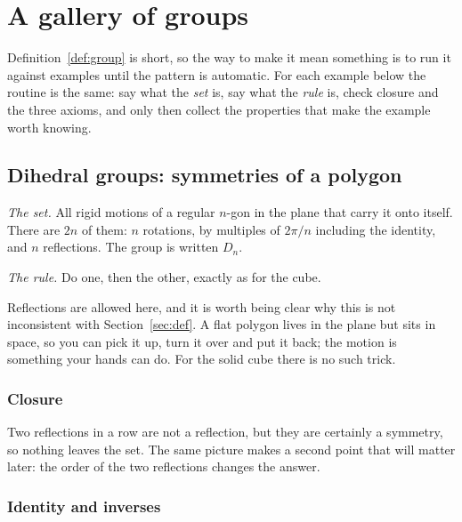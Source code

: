 \section{A gallery of groups}

Definition~\ref{def:group} is short, so the way to make it mean something is to run it against
examples until the pattern is automatic. For each example below the routine is the same: say what
the \emph{set} is, say what the \emph{rule} is, check closure and the three axioms, and only then
collect the properties that make the example worth knowing.

\subsection{Dihedral groups: symmetries of a polygon}\label{sec:dihedral}

\emph{The set.} All rigid motions of a regular $n$-gon in the plane that carry it onto itself. There
are $2n$ of them: $n$ rotations, by multiples of $2\pi/n$ including the identity, and $n$
reflections. The group is written $D_n$.

\emph{The rule.} Do one, then the other, exactly as for the cube.

Reflections are allowed here, and it is worth being clear why this is not inconsistent with
Section~\ref{sec:def}. A flat polygon lives in the plane but sits in space, so you can pick it up,
turn it over and put it back; the motion is something your hands can do. For the solid cube there
is no such trick.

\subsubsection*{Closure}

Two reflections in a row are not a reflection, but they are certainly a symmetry, so nothing leaves
the set. The same picture makes a second point that will matter later: the order of the two
reflections changes the answer.


\subsubsection*{Identity and inverses}


